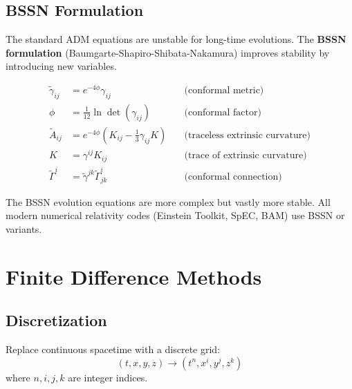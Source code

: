 \subsection{BSSN Formulation}

The standard ADM equations are unstable for long-time evolutions. The \textbf{BSSN formulation}\cite{shibata1995,baumgarte1999} (Baumgarte-Shapiro-Shibata-Nakamura) improves stability by introducing new variables.

\begin{definition}\label{def:bssn-variables}
\begin{align}
\tilde{\gamma}_{ij} &= e^{-4\phi} \gamma_{ij} \quad &\text{(conformal metric)}\\
\phi &= \frac{1}{12}\ln\det(\gamma_{ij}) \quad &\text{(conformal factor)}\\
\tilde{A}_{ij} &= e^{-4\phi}(K_{ij} - \frac{1}{3}\gamma_{ij}K) \quad &\text{(traceless extrinsic curvature)}\\
K &= \gamma^{ij}K_{ij} \quad &\text{(trace of extrinsic curvature)}\\
\tilde{\Gamma}^i &= \tilde{\gamma}^{jk}\tilde{\Gamma}^i_{jk} \quad &\text{(conformal connection)}
\end{align}
\end{definition}

The BSSN evolution equations are more complex but vastly more stable. All modern numerical relativity codes\cite{loffler2012,baumgarte2010} (Einstein Toolkit, SpEC, BAM) use BSSN or variants.

\section{Finite Difference Methods}

\subsection{Discretization}

Replace continuous spacetime with a discrete grid:
\begin{equation}
(t, x, y, z) \to (t^n, x^i, y^j, z^k)
\end{equation}
where $n, i, j, k$ are integer indices.

